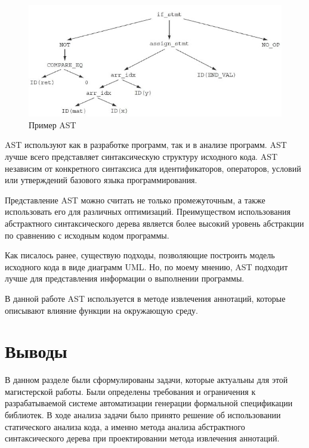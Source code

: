 \begin{figure}[htbp]
\centering
\includegraphics[width=\textwidth]{fig/ast_example_1.jpeg}
\caption{Пример AST}%
\label{fig:ast_example_1}
\end{figure}

AST используют как в разработке программ, так и в анализе программ.
AST лучше всего представляет синтаксическую структуру исходного кода. AST независим от конкретного синтаксиса для идентификаторов, операторов, условий или утверждений базового языка программирования.

Представление AST можно считать не только промежуточным, а также использовать его для различных оптимизаций. Преимуществом использования абстрактного синтаксического дерева является более высокий уровень абстракции по сравнению с исходным кодом программы.

Как писалось ранее, существую подходы, позволяющие построить модель исходного кода в виде диаграмм UML. Но, по моему мнению, AST подходит лучше для представления информации о выполнении программы.

В данной работе AST используется в методе извлечения аннотаций, которые описывают влияние функции на окружающую среду.

\section{Выводы}

В данном разделе были сформулированы задачи, которые актуальны для этой магистерской работы. Были определены требования и ограничения к разрабатываемой системе автоматизации генерации формальной спецификации библиотек.
В ходе анализа задачи было принято решение об использовании статического анализа кода, а именно метода анализа абстрактного синтаксического дерева при проектировании метода извлечения аннотаций.